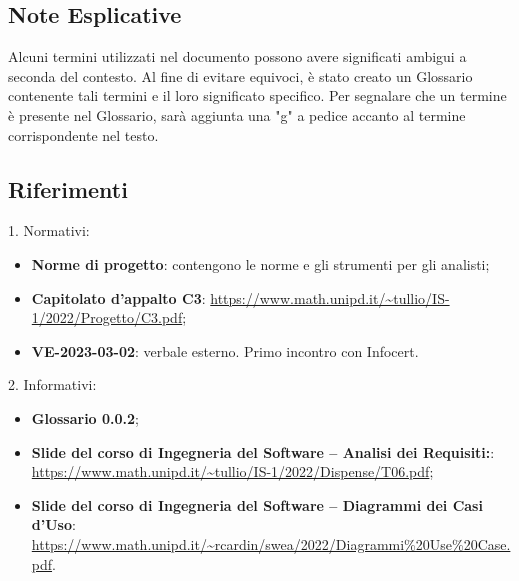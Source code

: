 \subsection{Note Esplicative}
Alcuni termini utilizzati nel documento possono avere significati ambigui a seconda del contesto. Al fine di evitare equivoci, è stato creato un Glossario contenente tali termini 
e il loro significato specifico. Per segnalare che un termine è presente nel Glossario, sarà aggiunta una "g" a pedice accanto al termine corrispondente nel testo.

\subsection{Riferimenti}
1. Normativi: 
\begin{itemize}
    \item \textbf{Norme di progetto}: contengono le norme e gli strumenti per gli analisti;
    \item \textbf{Capitolato d’appalto C3}: \url{https://www.math.unipd.it/~tullio/IS-1/2022/Progetto/C3.pdf};
    \item \textbf{VE-2023-03-02}: verbale esterno. Primo incontro con Infocert.
\end{itemize}
2. Informativi: 
\begin{itemize}
    \item \textbf{Glossario 0.0.2};
    \item \textbf{Slide del corso di Ingegneria del Software – Analisi dei Requisiti:}: \url{https://www.math.unipd.it/~tullio/IS-1/2022/Dispense/T06.pdf};
    \item \textbf{Slide del corso di Ingegneria del Software – Diagrammi dei Casi d’Uso}: \url{https://www.math.unipd.it/~rcardin/swea/2022/Diagrammi%20Use%20Case.pdf}.
\end{itemize}